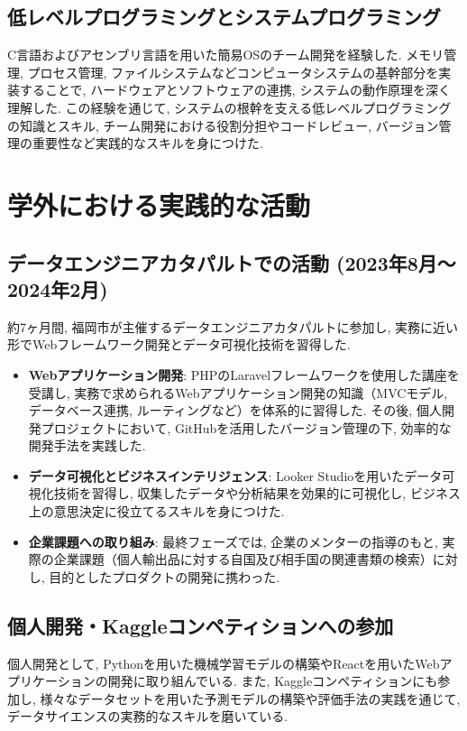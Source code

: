 \documentclass[dvipdfmx]{jsarticle}
\begin{document}
\subsection{低レベルプログラミングとシステムプログラミング}
C言語およびアセンブリ言語を用いた簡易OSのチーム開発を経験した.
メモリ管理, プロセス管理, ファイルシステムなどコンピュータシステムの基幹部分を実装することで, ハードウェアとソフトウェアの連携, システムの動作原理を深く理解した.
この経験を通じて, システムの根幹を支える低レベルプログラミングの知識とスキル, チーム開発における役割分担やコードレビュー, バージョン管理の重要性など実践的なスキルを身につけた.

\section{学外における実践的な活動}

\subsection{データエンジニアカタパルトでの活動 (2023年8月～2024年2月)}
約7ヶ月間, 福岡市が主催するデータエンジニアカタパルトに参加し, 実務に近い形でWebフレームワーク開発とデータ可視化技術を習得した.
\begin{itemize}[itemsep=0pt,topsep=2pt,parsep=0pt,partopsep=0pt]
    \item \textbf{Webアプリケーション開発}:
          PHPのLaravelフレームワークを使用した講座を受講し, 実務で求められるWebアプリケーション開発の知識（MVCモデル, データベース連携, ルーティングなど）を体系的に習得した.
          その後, 個人開発プロジェクトにおいて, GitHubを活用したバージョン管理の下, 効率的な開発手法を実践した.
    \item \textbf{データ可視化とビジネスインテリジェンス}:
          Looker Studioを用いたデータ可視化技術を習得し, 収集したデータや分析結果を効果的に可視化し, ビジネス上の意思決定に役立てるスキルを身につけた.
    \item \textbf{企業課題への取り組み}:
          最終フェーズでは, 企業のメンターの指導のもと, 実際の企業課題（個人輸出品に対する自国及び相手国の関連書類の検索）に対し, 目的としたプロダクトの開発に携わった.
\end{itemize}

\subsection{個人開発・Kaggleコンペティションへの参加}
個人開発として, Pythonを用いた機械学習モデルの構築やReactを用いたWebアプリケーションの開発に取り組んでいる.
また, Kaggleコンペティションにも参加し, 様々なデータセットを用いた予測モデルの構築や評価手法の実践を通じて, データサイエンスの実務的なスキルを磨いている.
\end{document}

